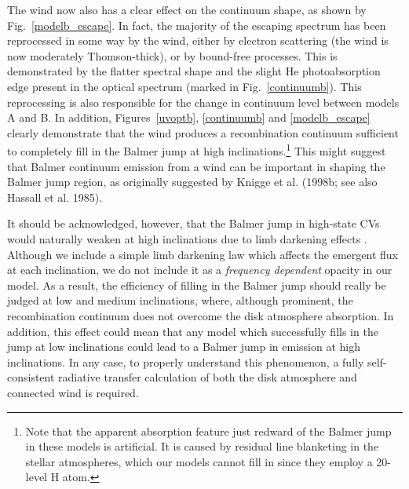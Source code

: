 \documentclass[preprint, a4paper, 11pt]{aastex}
\begin{document}
The wind now also has a clear effect on the continuum shape,
as shown by Fig.~\ref{modelb_escape}. In fact, the majority of the
escaping spectrum has been reprocessed in some way by the wind,
either by electron scattering (the wind is now moderately Thomson-thick),
or by bound-free processes. This is demonstrated by the flatter spectral shape
and the slight He photoabsorption edge present in the optical spectrum 
(marked in Fig.~\ref{continuumb}). This reprocessing is also
responsible for the change in continuum level between models A and B.
In addition, Figures~\ref{uvoptb}, \ref{continuumb} 
and \ref{modelb_escape} clearly demonstrate that the wind produces
a recombination continuum sufficient to completely fill in the Balmer jump
at high inclinations.\footnote{Note that the apparent absorption feature 
just redward of the Balmer jump in these models is artificial. It is
caused by residual line blanketing in the stellar atmospheres, which
our models cannot fill in since they employ a 20-level H atom.}
This might suggest that Balmer continuum emission from a wind can be important 
in shaping the Balmer jump region, as
originally suggested by Knigge et al.
(1998b; see also Hassall et al. 1985)\nocite{KLWB98,hassall}. 

It should be acknowledged, however,
that the Balmer jump in high-state CVs would naturally weaken at
high inclinations due to limb darkening effects \citep{ladous1989, ladous1989b}. 
Although we include a simple limb darkening law which affects 
the emergent flux at each inclination, we do not
include it as a {\em frequency dependent} opacity in our model.
As a result, the efficiency of filling in the Balmer jump
should really be judged at low and medium inclinations, 
where, although prominent, the recombination continuum does
not overcome the disk atmosphere absorption. 
In addition, this effect 
could mean that any model which successfully fills in the 
jump at low inclinations could lead to a Balmer jump 
in emission at high inclinations.
In any case, to properly understand this phenomenon, a fully self-consistent
radiative transfer calculation of both the disk atmosphere
and connected wind is required.
\end{document}
